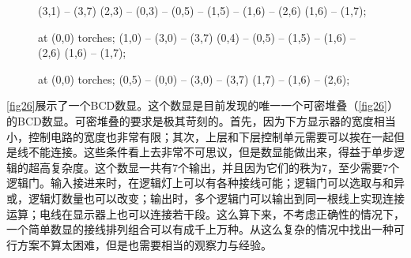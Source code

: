 \begin{figure}[!htp]
{\begin{tikzpictureC}[
      TRsch,
      torches/.pic = {
        \placeSevenSegment{1110111}
        \placetiles{Junction_Box_X}{3/3,3/6}
      }]
\begin{scope}[xshift=80pt]
          (3,1) -- (3,7)
          (2,3) -- (0,3) -- (0,5) -- (1,5) -- (1,6) -- (2,6)
          (1,6) -- (1,7);
      \end{scope}
      \begin{scope}[xshift=160pt]
        \pic at (0,0) {torches};
          (1,0) -- (3,0) -- (3,7)
          (0,4) -- (0,5) -- (1,5) -- (1,6) -- (2,6)
          (1,6) -- (1,7);
      \end{scope}
      \begin{scope}[xshift=240pt]
        \pic at (0,0) {torches};
          (0,5) -- (0,0) -- (3,0) -- (3,7)
          (1,7) -- (1,6) -- (2,6);
      \end{scope}
    \end{tikzpictureC}
  }
  \caption{}\label{fig26}
\end{figure}

\autoref{fig26}展示了一个BCD数显。这个数显是目前发现的唯一一个可密堆叠（\autoref{fig26}）的BCD数显。可密堆叠的要求是极其苛刻的。首先，因为下方显示器的宽度相当小，控制电路的宽度也非常有限；其次，上层和下层控制单元需要可以挨在一起但是线不能连接。这些条件看上去非常不可思议，但是数显能做出来，得益于单步逻辑的超高复杂度。这个数显一共有7个输出，并且因为它们的秩为7，至少需要7个逻辑门。输入接进来时，在逻辑灯上可以有各种接线可能；逻辑门可以选取与和异或，逻辑灯数量也可以改变；输出时，多个逻辑门可以输出到同一根线上实现连接运算；电线在显示器上也可以连接若干段。这么算下来，不考虑正确性的情况下，一个简单数显的接线排列组合可以有成千上万种。从这么复杂的情况中找出一种可行方案不算太困难，但是也需要相当的观察力与经验。

